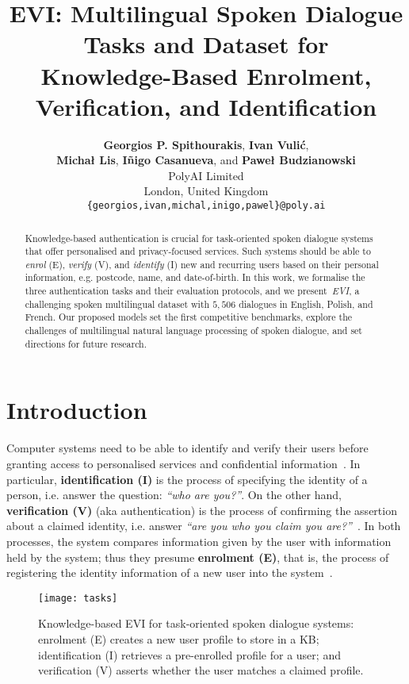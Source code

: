 \documentclass[11pt]{article}
\title{
EVI: Multilingual Spoken Dialogue Tasks and Dataset for \\
Knowledge-Based Enrolment, Verification, and Identification
}
\author{
    \vspace{2mm}
    \textbf{Georgios P. Spithourakis},
    \textbf{Ivan Vuli\'{c}}, \\
    \vspace{2mm}
    \textbf{Micha\l{} Lis},
    \textbf{I\~{n}igo Casanueva},
    {\normalfont and} \textbf{Pawe\l{} Budzianowski} \\
\vspace{2mm}
    PolyAI Limited \\
    London, United Kingdom \\
    \texttt{\small\{georgios,ivan,michal,inigo,pawel\}@poly.ai} \\
}
\date{}
\begin{document}
\maketitle







\begin{abstract}
Knowledge-based authentication is crucial for task-oriented spoken dialogue systems that offer personalised and privacy-focused services. Such systems should be able to \textit{enrol} (E), \textit{verify} (V), and \textit{identify} (I) new and recurring users based on their personal information, e.g. postcode, name, and date-of-birth. In this work, we formalise the three authentication tasks and their evaluation protocols, and we present~\textit{EVI}, a challenging spoken multilingual dataset with $5,506$ dialogues in English, Polish, and French. Our proposed models set the first competitive benchmarks, explore the challenges of multilingual natural language processing of spoken dialogue, and set directions for future research.

\end{abstract}

\section{Introduction}
\label{sec:intro}
Computer systems need to be able to identify and verify their users
before granting access to personalised services and confidential information~\cite{braz2006security,o2003comparing}.
In particular,
\textbf{identification (I)} is the process of
specifying the identity of a person,
i.e. answer the question: \textit{``who are you?''}.
On the other hand,
\textbf{verification (V)} (aka authentication) is the process of
confirming the assertion about a claimed identity,
i.e. answer \textit{``are you who you claim you are?''}~\cite{jain2004introduction}.
In both processes,
the system compares information given by the user
with information held by the system;
thus they presume \textbf{enrolment (E)},
that is, the process of registering the identity information of a new user into the system~\cite{jain2004introduction}.

\begin{figure}[!t]
\centering
\texttt{[image: tasks]}
\caption{
Knowledge-based EVI for task-oriented spoken dialogue systems:
enrolment (E) creates a new user profile to store in a KB;
identification (I) retrieves a pre-enrolled profile for a user;
and verification (V) asserts whether the user matches a claimed profile.
}
\label{fig:tasks}
\end{figure}
 
\end{document}
